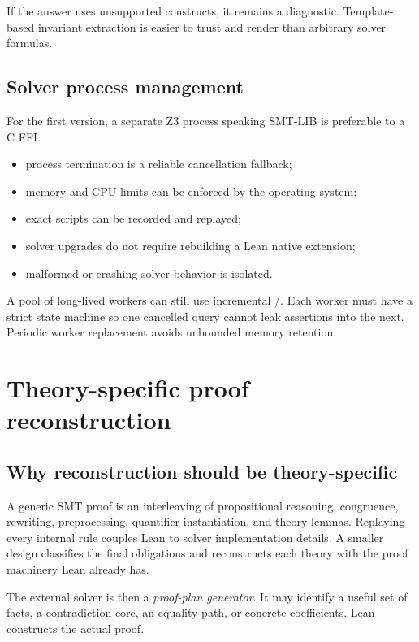 \documentclass[11pt,letterpaper,openany]{report}
\newcommand{\code}[1]{\texttt{\detokenize{#1}}}
\begin{document}
If the answer uses unsupported constructs, it remains a diagnostic. Template-based
invariant extraction is easier to trust and render than arbitrary solver formulas.

\section{Solver process management}

For the first version, a separate Z3 process speaking SMT-LIB is preferable to a C FFI:

\begin{itemize}
  \item process termination is a reliable cancellation fallback;
  \item memory and CPU limits can be enforced by the operating system;
  \item exact scripts can be recorded and replayed;
  \item solver upgrades do not require rebuilding a Lean native extension;
  \item malformed or crashing solver behavior is isolated.
\end{itemize}

A pool of long-lived workers can still use incremental \code{push}/\code{pop}. Each
worker must have a strict state machine so one cancelled query cannot leak assertions
into the next. Periodic worker replacement avoids unbounded memory retention.


\chapter{Theory-specific proof reconstruction}
\label{ch:reconstruction}

\section{Why reconstruction should be theory-specific}

A generic SMT proof is an interleaving of propositional reasoning, congruence,
rewriting, preprocessing, quantifier instantiation, and theory lemmas. Replaying every
internal rule couples Lean to solver implementation details. A smaller design
classifies the final obligations and reconstructs each theory with the proof machinery
Lean already has.

The external solver is then a \emph{proof-plan generator}. It may identify a useful
set of facts, a contradiction core, an equality path, or concrete coefficients. Lean
constructs the actual proof.
\end{document}
